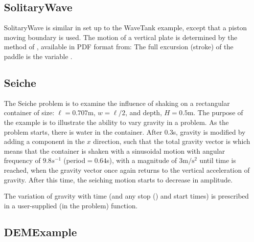 \documentclass{../GPUSPHtemplate}
\begin{document}
\subsection{SolitaryWave}

SolitaryWave is similar in set up to the WaveTank example, except that a
piston moving boundary is used. The motion of a vertical plate is
determined by the method of \cite{goring_tsunamis_1979}, available in PDF format
from:
The full excursion (stroke) of the paddle is the variable .

\subsection{Seiche}

The Seiche problem is to examine the influence of shaking on a
rectangular container of size: $\ell = 0.707$m, $w = \ell/2$, and depth,
$H = 0.5$m. The purpose of the example is to illustrate the ability to
vary gravity in a problem. As the problem starts, there is water in the
container. After $0.3$s, gravity is modified by adding a component in
the $x$ direction, such that the total gravity vector is
which means that the container is shaken with a sinusoidal
motion with angular frequency of $9.8s^{-1}$ (period${} = 0.64$s),
with a magnitude of $3\text{m}/\text{s}^2$ until time 
is reached, when the gravity vector once again returns to the vertical
acceleration of gravity. After this time, the seiching motion starts to
decrease in amplitude.

\iffalse
\begin{figure}[h]
\centering{%
\texttt{[image: Seiche.png]}%
}
\caption{Resonant seiching in a rectangular domain showing the results
of a time varying gravity in the problem, \cmd{Seiche.cc}. Here the tank has
been shaking side to side at the resonant frequency of $0.638$s. The
color coding is for the pressure in the fluid.}
\end{figure}
\else
\fi

The variation of gravity with time (and any stop () and
start times) is prescribed in a user-supplied (in the problem)
 function.

\subsection{DEMExample}
\end{document}
